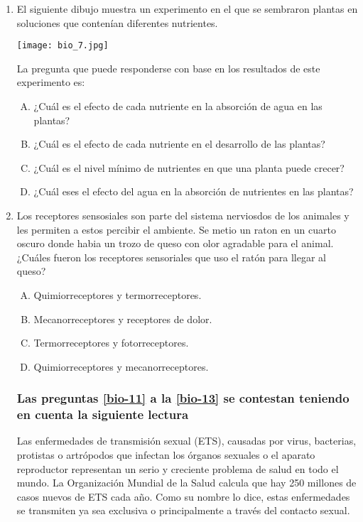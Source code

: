 \begin{enumerate}
\item El siguiente dibujo muestra un experimento en el que se sembraron plantas en soluciones que contenían diferentes nutrientes. \label{bio-9}

\begin{center}
\texttt{[image: bio\_7.jpg]} 
\end{center}

La pregunta que puede responderse con base en los resultados de este experimento es:

\begin{enumerate}[(A)]
\item ¿Cuál  es el efecto de cada nutriente en la absorción de agua en las plantas?
\item ¿Cuál  es el efecto de cada nutriente en el desarrollo de las plantas?
\item ¿Cuál  es el nivel mínimo de nutrientes en que una planta puede crecer?
\item ¿Cuál  eses el efecto del agua en la absorción de nutrientes en las plantas?
\end{enumerate}

\newpage
\item Los receptores sensosiales son parte del sistema nerviosdos de los animales y les permiten a estos percibir el ambiente.  Se metio un raton en un  cuarto oscuro donde habia un trozo de queso con olor agradable para el animal.  ¿Cuáles fueron los receptores sensoriales que uso el ratón para llegar al queso? \label{bio-10}

\begin{enumerate}[(A)]
\item Quimiorreceptores y termorreceptores.
\item Mecanorreceptores y receptores de dolor.
\item Termorreceptores y fotorreceptores.
\item Quimiorreceptores y mecanorreceptores.
\end{enumerate}


\subsubsection*{Las preguntas \ref{bio-11} a la \ref{bio-13}  se contestan teniendo en cuenta la siguiente lectura}

Las enfermedades de transmisión sexual (ETS), causadas por virus, bacterias, protistas o artrópodos que infectan los órganos sexuales o el aparato reproductor representan un serio y creciente problema de salud en todo el mundo. La Organización Mundial de la Salud calcula que hay 250 millones de casos nuevos de ETS cada año. Como su nombre lo dice, estas enfermedades se transmiten ya sea exclusiva o principalmente a través del contacto sexual. 



\end{enumerate}
